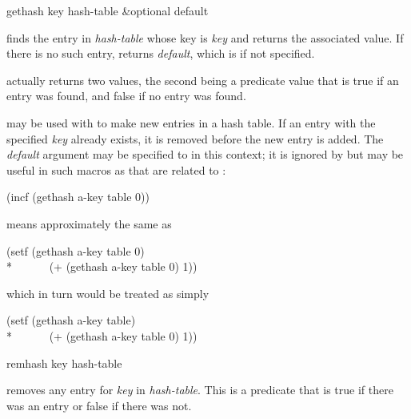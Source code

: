 \begin{defun}[Function]
gethash key hash-table &optional default

 finds the entry in {\it hash-table} whose key is {\it key}
and returns the
associated value.  If there is no such entry,  returns {\it default},
which is {\false} if not specified.

 actually returns two values, the second being a predicate
value that is true if an entry was found, and false if no entry was found.

 may be used with  to make new entries in a hash
table.  If an entry with the specified {\it key} already exists, it is
removed before the new entry is added.  The {\it default} argument may be
specified to  in this context; it is ignored by 
but may be useful in such macros as  that are related to :
\begin{lisp}
(incf (gethash a-key table 0))
\end{lisp}
means approximately the same as
\begin{lisp}
(setf (gethash a-key table 0) \\*
~~~~~~(+ (gethash a-key table 0) 1))
\end{lisp}
which in turn would be treated as simply
\begin{lisp}
(setf (gethash a-key table) \\*
~~~~~~(+ (gethash a-key table 0) 1))
\end{lisp}
\end{defun}

\begin{defun}[Function]
remhash key hash-table

 removes
any entry for {\it key} in {\it hash-table}.  This is a predicate
that is true if there was an
entry or false if there was not.
\end{defun}

